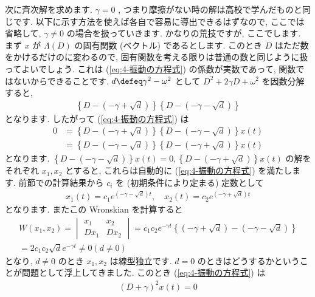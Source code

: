 \documentclass[openany, a4paper, oneside]{jsbook}
\begin{document}
次に斉次解を求めます.
$\gamma = 0$ , つまり摩擦がない時の解は高校で学んだものと同じです.
以下に示す方法を使えば各自で容易に導出できるはずなので,
ここでは省略して,  $\gamma \not= 0$ の場合を扱っていきます.
かなりの荒技ですが, ここでします.
まず $x$ が $\Lambda (D)$ の固有関数 (ベクトル) であるとします.
このとき $D$ はただ数をかけるだけのに変わるので,
固有関数を考える限りは普通の数と同じように扱ってよいでしょう.
これは (\ref{eq:4-振動の方程式}) の係数が実数であって, 関数ではないからできることです.
$d \defeq \gamma ^2 - \omega ^2$ として $D^2 + 2 \gamma D + \omega ^2$ を因数分解すると,
\begin{gather}
\left \{ D - ( - \gamma + \sqrt{d} ) \right \} \left \{ D - ( - \gamma - \sqrt{d} ) \right \}
\end{gather}
となります.
したがって (\ref{eq:4-振動の方程式}) は
\begin{align}
0
&=
\left \{ D - ( - \gamma + \sqrt{d} ) \right \} \left \{ D - ( - \gamma - \sqrt{d} ) \right \} x (t) \\
&=
\left \{ D - ( - \gamma - \sqrt{d} ) \right \} \left \{ D - ( - \gamma + \sqrt{d} ) \right \} x (t)
\end{align}
となります.
$\left \{ D - ( - \gamma - \sqrt{d} ) \right \} x (t)=0,
\left \{ D - ( - \gamma + \sqrt{d} ) \right \} x (t)$
の解をそれぞれ $x_1 , x_2$ とすると, これらは自動的に (\ref{eq:4-振動の方程式}) を満たします.
前節での計算結果から $c_i$ を (初期条件により定まる) 定数として
\begin{gather}
x_1 (t)
=
c_1 e^{ ( - \gamma - \sqrt{d} ) t}
, \quad
x_2 (t)
=
c_2 e^{ ( -\gamma + \sqrt{d} ) t}
\end{gather}
となります.
またこの Wronskian を計算すると
\begin{gather}
W (x_1 ,x_2)
=
\begin{vmatrix}
x_1 & x_2 \\
D x_1 & D x_2
\end{vmatrix}
=
c_1 c_2 e^{- \gamma t} \left \{ ( -\gamma + \sqrt{d} ) - ( - \gamma - \sqrt{d} ) \right \}  \\
=
2 c_1 c_2 \sqrt{d} e^{- \gamma t}
\not=
0 ( d \not= 0)
\end{gather}
となり,  $d \not= 0$ のとき $x_1,x_2$ は線型独立です.
$d=0$ のときはどうするかということが問題として浮上してきました.
このとき (\ref{eq:4-振動の方程式}) は
\begin{gather}
( D + \gamma ) ^2 x (t) =0
\end{gather}
\end{document}
